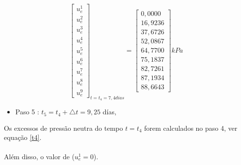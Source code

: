 \documentclass{article} %
\begin{document}
\begin{equation}\label{t4}
\begin{bmatrix}
u_e^1\\
u_e^2\\
u_e^3\\
u_e^4\\
u_e^5\\
u_e^6\\
u_e^7\\
u_e^8\\
u_e^9
\end{bmatrix}_{t=t_4=7,4dias}=\begin{bmatrix}
0,0000\\
16,9236\\
37,6726\\
52,0867\\
64,7700\\
75,1837\\
82,7261\\
87,1934\\
88,6643
\end{bmatrix}kPa
\end{equation}


\begin{itemize}
	\item Paso 5 : \(t_5=t_4+\triangle t=9,25\) días,
\end{itemize}

Os excessos de pressão neutra do tempo \(t=t_4\) forem calculados no paso 4, ver equação \ref{t4}.\\
\\
\indent Além disso, o valor de (\(u_e^1=0\)).\\
\end{document}

